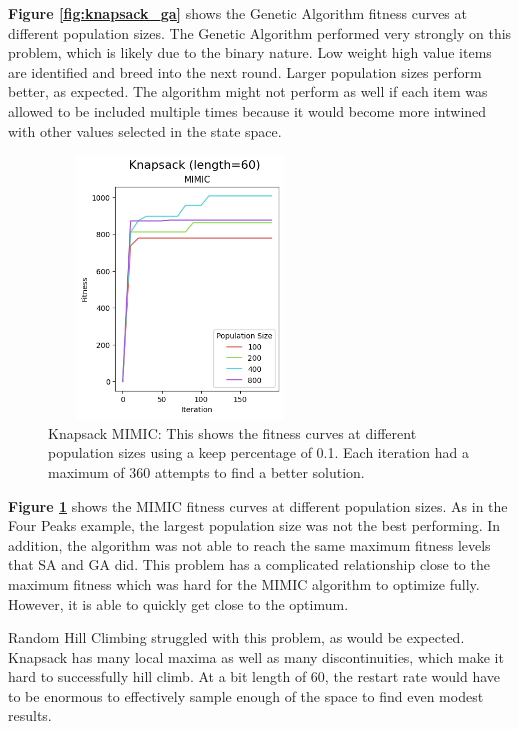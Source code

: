 \documentclass[letterpaper]{article} %
\begin{document}
\textbf{Figure \ref{fig:knapsack_ga}} shows the Genetic Algorithm fitness curves at different population sizes.  The Genetic Algorithm performed very strongly on this problem, which is likely due to the binary nature.  Low weight high value items are identified and breed into the next round.  Larger population sizes perform better, as expected.  The algorithm might not perform as well if each item was allowed to be included multiple times because it would become more intwined with other values selected in the state space.

\begin{figure}[!htb]
\centering
\includegraphics[width=2.75in, height=2.75in]{figures/Knapsack_length=60_MIMIC_l_60_ma_360_p_100__200__400__800_k_0.1_.png}
\caption{Knapsack MIMIC: This shows the fitness curves at different population sizes using a keep percentage of 0.1. Each iteration had a maximum of 360 attempts to find a better solution. }
\label{fig:knapsack_mimic}
\end{figure}

\textbf{Figure \ref{fig:knapsack_mimic}} shows the MIMIC fitness curves at different population sizes.   As in the Four Peaks example, the largest population size was not the best performing.  In addition, the algorithm was not able to reach the same maximum fitness levels that SA and GA did.  This problem has a complicated relationship close to the maximum fitness which was hard for the MIMIC algorithm to optimize fully.  However, it is able to quickly get close to the optimum.

Random Hill Climbing struggled with this problem, as would be expected.  Knapsack has many local maxima as well as many discontinuities, which make it hard to successfully hill climb.   At a bit length of 60, the restart rate would have to be enormous to effectively sample enough of the space to find even modest results.
\end{document}
